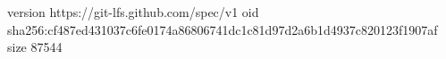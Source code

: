 version https://git-lfs.github.com/spec/v1
oid sha256:cf487ed431037c6fe0174a86806741dc1c81d97d2a6b1d4937c820123f1907af
size 87544
